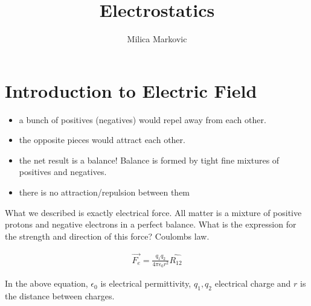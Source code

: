 \documentclass{ximera}
\title{Electrostatics}
\author{Milica Markovic}
\begin{document}
  
\begin{abstract}  

\end{abstract}  
\maketitle    


\section{Introduction to Electric Field}


\begin{itemize}
\item a bunch of positives (negatives) would repel away from each other.
\item the opposite pieces would attract each other.
\item the net result is a balance! Balance is formed by tight fine mixtures of positives and negatives.
\item there is no attraction/repulsion between them
\end{itemize}
 

What we described is exactly electrical force. All matter is a mixture of positive protons and negative electrons in a perfect balance. What is the expression for the strength and direction of this force? Coulombs law.

\begin{eqnarray}
\vec{F_e}=\frac{q_1 q_2}{4 \pi \epsilon_0 r^2} \hat{R_{12}}
\end{eqnarray}\label{Coulombslaw}

In the above equation, $\epsilon_0$ is electrical permittivity, $q_1,q_2$ electrical charge and $r$ is the distance between charges.
\end{document}
